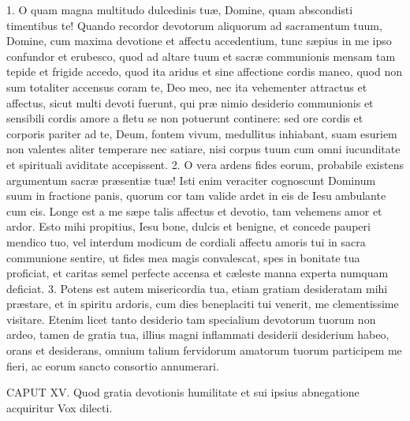 \documentclass[twoside]{article}
\begin{document}
1. O quam magna multitudo dulcedinis tuæ, Domine, quam abscondisti timentibus te! Quando recordor devotorum aliquorum ad sacramentum tuum, Domine, cum maxima devotione et affectu accedentium, tunc sæpius in me ipso confundor et erubesco, quod ad altare tuum et sacræ communionis mensam tam tepide et frigide accedo, quod ita aridus et sine affectione cordis maneo, quod non sum totaliter accensus coram te, Deo meo, nec ita vehementer attractus et affectus, sicut multi devoti fuerunt, qui præ nimio desiderio communionis et sensibili cordis amore a fletu se non potuerunt continere: sed ore cordis et corporis pariter ad te, Deum, fontem vivum, medullitus inhiabant, suam esuriem non valentes aliter temperare nec satiare, nisi corpus tuum cum omni iucunditate et spirituali aviditate accepissent.
2. O vera ardens fides eorum, probabile existens argumentum sacræ præsentiæ tuæ! Isti enim veraciter cognoscunt Dominum suum in fractione panis, quorum cor tam valide ardet in eis de Iesu ambulante cum eis. Longe est a me sæpe talis affectus et devotio, tam vehemens amor et ardor. Esto mihi propitius, Iesu bone, dulcis et benigne, et concede pauperi mendico tuo, vel interdum modicum de cordiali affectu amoris tui in sacra communione sentire, ut fides mea magis convalescat, spes in bonitate tua proficiat, et caritas semel perfecte accensa et cæleste manna experta numquam deficiat.
3. Potens est autem misericordia tua, etiam gratiam desideratam mihi præstare, et in spiritu ardoris, cum dies beneplaciti tui venerit, me clementissime visitare. Etenim licet tanto desiderio tam specialium devotorum tuorum non ardeo, tamen de gratia tua, illius magni inflammati desiderii desiderium habeo, orans et desiderans, omnium talium fervidorum amatorum tuorum participem me fieri, ac eorum sancto consortio annumerari.


CAPUT XV.
Quod gratia devotionis humilitate et sui ipsius abnegatione acquiritur
Vox dilecti.
\end{document}

